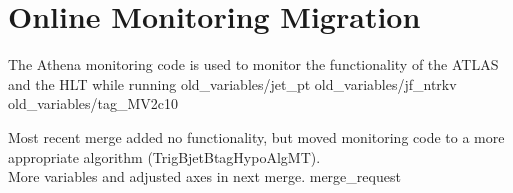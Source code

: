 \section{Online Monitoring Migration}

{ \small The Athena monitoring code is used to monitor the functionality of the ATLAS and the HLT while running }
{old_variables/jet_pt} 
{old_variables/jf_ntrkv} 
{old_variables/tag_MV2c10} 




{ \small Most recent merge added no functionality,
    but moved monitoring code to a more appropriate algorithm 
    {\tiny (TrigBjetBtagHypoAlgMT)}.\\ \vspace{7mm}
    More variables and adjusted axes in next merge.  }
{merge_request}
